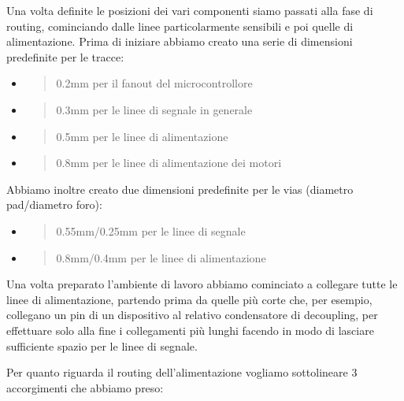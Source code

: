 Una volta definite le posizioni dei vari componenti siamo passati alla
fase di routing, cominciando dalle linee particolarmente sensibili e poi
quelle di alimentazione. Prima di iniziare abbiamo creato una serie di
dimensioni predefinite per le tracce:

\begin{itemize}
\item
  \begin{quote}
  0.2mm per il fanout del microcontrollore
  \end{quote}
\item
  \begin{quote}
  0.3mm per le linee di segnale in generale
  \end{quote}
\item
  \begin{quote}
  0.5mm per le linee di alimentazione
  \end{quote}
\item
  \begin{quote}
  0.8mm per le linee di alimentazione dei motori
  \end{quote}
\end{itemize}

Abbiamo inoltre creato due dimensioni predefinite per le vias (diametro
pad/diametro foro):

\begin{itemize}
\item
  \begin{quote}
  0.55mm/0.25mm per le linee di segnale
  \end{quote}
\item
  \begin{quote}
  0.8mm/0.4mm per le linee di alimentazione
  \end{quote}
\end{itemize}

Una volta preparato l'ambiente di lavoro abbiamo cominciato a collegare
tutte le linee di alimentazione, partendo prima da quelle più corte che,
per esempio, collegano un pin di un dispositivo al relativo condensatore
di decoupling, per effettuare solo alla fine i collegamenti più lunghi
facendo in modo di lasciare sufficiente spazio per le linee di segnale.

Per quanto riguarda il routing dell'alimentazione vogliamo sottolineare
3 accorgimenti che abbiamo preso:

